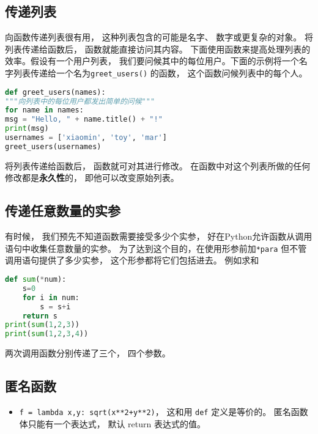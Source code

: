 \subsection{传递列表}
向函数传递列表很有用， 这种列表包含的可能是名字、 数字或更复杂的对象。 将列表传递给函数后， 函数就能直接访问其内容。 下面使用函数来提高处理列表的效率。假设有一个用户列表， 我们要问候其中的每位用户。下面的示例将一个名字列表传递给一个名为\verb|greet_users()| 的函数， 这个函数问候列表中的每个人。
\begin{lstlisting}[language=python]
def greet_users(names):
"""向列表中的每位用户都发出简单的问候"""
for name in names:
msg = "Hello, " + name.title() + "!"
print(msg)
usernames = ['xiaomin', 'toy', 'mar']
greet_users(usernames)
\end{lstlisting}
将列表传递给函数后， 函数就可对其进行修改。 在函数中对这个列表所做的任何修改都是\textbf{永久性}的， 即他可以改变原始列表。

\subsection{传递任意数量的实参}
有时候， 我们预先不知道函数需要接受多少个实参， 好在Python允许函数从调用语句中收集任意数量的实参。 为了达到这个目的，在使用形参前加\verb|*para| 但不管调用语句提供了多少实参， 这个形参都将它们包括进去。 例如求和
\begin{lstlisting}[language=python]
def sum(*num):
    s=0
    for i in num:
        s = s+i
    return s
print(sum(1,2,3))
print(sum(1,2,3,4))
\end{lstlisting}
两次调用函数分别传递了三个， 四个参数。

\subsection{匿名函数}
\begin{itemize}
\item \verb|f = lambda x,y: sqrt(x**2+y**2)|， 这和用 \verb|def| 定义是等价的。 匿名函数体只能有一个表达式， 默认 return 表达式的值。
\end{itemize}
